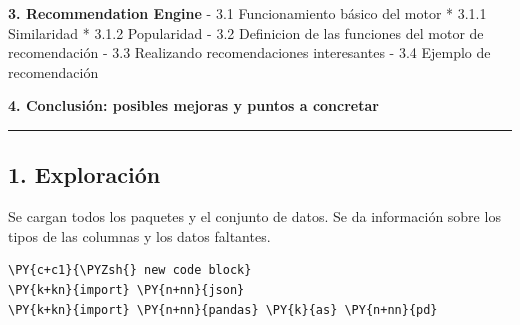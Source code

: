 \textbf{3. Recommendation Engine} - 3.1 Funcionamiento básico del motor
* 3.1.1 Similaridad * 3.1.2 Popularidad - 3.2 Definicion de las
funciones del motor de recomendación - 3.3 Realizando recomendaciones
interesantes - 3.4 Ejemplo de recomendación

\textbf{4. Conclusión: posibles mejoras y puntos a concretar}

    \begin{center}\rule{0.5\linewidth}{\linethickness}\end{center}

\subsection{1. Exploración}\label{exploraciuxf3n}

Se cargan todos los paquetes y el conjunto de datos. Se da información
sobre los tipos de las columnas y los datos faltantes.

    \begin{tcolorbox}[breakable, size=fbox, boxrule=1pt, pad at break*=1mm,colback=cellbackground, colframe=cellborder]
\begin{Verbatim}[commandchars=\\\{\}]
\PY{c+c1}{\PYZsh{} new code block}
\PY{k+kn}{import} \PY{n+nn}{json}
\PY{k+kn}{import} \PY{n+nn}{pandas} \PY{k}{as} \PY{n+nn}{pd}
\end{Verbatim}
\end{tcolorbox}

